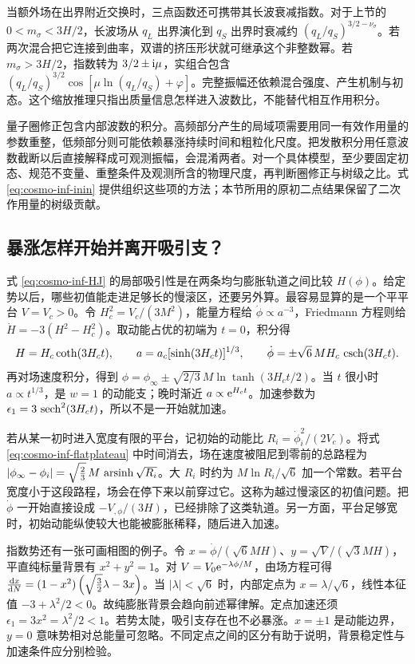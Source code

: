 当额外场在出界附近交换时，三点函数还可携带其长波衰减指数。对于上节的 $0<m_\sigma<3H/2$，长波场从 $q_L$ 出界演化到 $q_S$ 出界时衰减约 $(q_L/q_S)^{3/2-\nu_\sigma}$。若两次混合把它连接到曲率，双谱的挤压形状就可继承这个非整数幂。若 $m_\sigma>3H/2$，指数转为 $3/2\pm\mathrm{i}\mu$，实组合包含 $(q_L/q_S)^{3/2}\cos[\mu\ln(q_L/q_S)+\varphi]$。完整振幅还依赖混合强度、产生机制与初态。这个缩放推理只指出质量信息怎样进入波数比，不能替代相互作用积分。

量子圈修正包含内部波数的积分。高频部分产生的局域项需要用同一有效作用量的参数重整，低频部分则可能依赖暴涨持续时间和粗粒化尺度。把发散积分用任意波数截断以后直接解释成可观测振幅，会混淆两者。对一个具体模型，至少要固定初态、规范不变量、重整条件及观测所含的物理尺度，再判断圈修正与树级之比。式 \eqref{eq:cosmo-inf-inin} 提供组织这些项的方法；本节所用的原初二点结果保留了二次作用量的树级贡献。

\subsection{暴涨怎样开始并离开吸引支？}\label{sec:cosmo-inf-initial}

式 \eqref{eq:cosmo-inf-HJ} 的局部吸引性是在两条均匀膨胀轨道之间比较 $H(\phi)$。给定势以后，哪些初值能走进足够长的慢滚区，还要另外算。最容易显算的是一个平平台 $V=V_c>0$。令 $H_c^2=V_c/(3M^2)$，能量方程给 $\dot\phi\propto a^{-3}$，Friedmann 方程则给 $\dot H=-3(H^2-H_c^2)$。取动能占优的初端为 $t=0$，积分得
\begin{equation}\label{eq:cosmo-inf-flatplateau}
 H=H_c\coth(3H_ct),\qquad
 a=a_c[\sinh(3H_ct)]^{1/3},\qquad
 \dot\phi=\pm\sqrt6\,M H_c\,\mathop{\rm csch}(3H_ct).
\end{equation}
再对场速度积分，得到 $\phi=\phi_\infty\pm\sqrt{2/3}\,M\ln\tanh(3H_ct/2)$。当 $t$ 很小时 $a\propto t^{1/3}$，是 $w=1$ 的动能支；晚时渐近 $a\propto\mathrm{e}^{H_ct}$。加速参数为 $\epsilon_1=3\,\mathop{\rm sech}^2(3H_ct)$，所以不是一开始就加速。

若从某一初时进入宽度有限的平台，记初始的动能比 $R_i=\dot\phi_i^2/(2V_c)$。将式 \eqref{eq:cosmo-inf-flatplateau} 中时间消去，场在速度被阻尼到零前的总路程为 $|\phi_\infty-\phi_i| =\sqrt{\frac23}\,M\,\mathop{\rm arsinh}\sqrt{R_i}$。大 $R_i$ 时约为 $M\ln R_i/\sqrt6$ 加一个常数。若平台宽度小于这段路程，场会在停下来以前穿过它。这称为越过慢滚区的初值问题。把 $\dot\phi$ 一开始直接设成 $-V_{,\phi}/(3H)$，已经排除了这类轨道。另一方面，平台足够宽时，初始动能纵使较大也能被膨胀稀释，随后进入加速。

指数势还有一张可画相图的例子。令 $x=\dot\phi/(\sqrt6MH)$、$y=\sqrt V/(\sqrt3MH)$，平直纯标量背景有 $x^2+y^2=1$。对 $V=V_0\mathrm{e}^{-\lambda\phi/M}$，由场方程可得 $\frac{\dd x}{\dd N} =(1-x^2)\left(\sqrt{\frac32}\lambda-3x\right)$。当 $|\lambda|<\sqrt6$ 时，内部定点为 $x=\lambda/\sqrt6$，线性本征值 $-3+\lambda^2/2<0$。故纯膨胀背景会趋向前述幂律解。定点加速还须 $\epsilon_1=3x^2=\lambda^2/2<1$。若势太陡，吸引支存在也不必暴涨。$x=\pm1$ 是动能边界，$y=0$ 意味势相对总能量可忽略。不同定点之间的区分有助于说明，背景稳定性与加速条件应分别检验。

